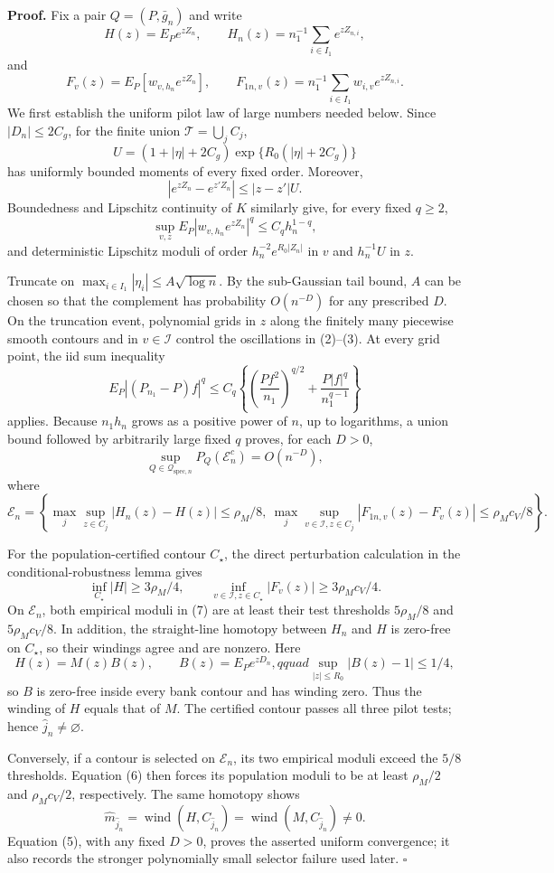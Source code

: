 \textbf{Proof.}
Fix a pair \(Q=(P,\bar g_n)\) and write
\[
 H(z)=E_Pe^{zZ_n},\qquad
 H_n(z)=n_1^{-1}\sum_{i\in I_1}e^{zZ_{n,i}},
\]
and
\[
 F_{v}(z)=E_P[w_{v,h_n}e^{zZ_n}],\qquad
 F_{1n,v}(z)=n_1^{-1}\sum_{i\in I_1}w_{i,v}e^{zZ_{n,i}}. \tag{1}
\]
We first establish the uniform pilot law of large numbers needed below.  Since \(|D_n|\le2C_g\), for the finite union \(\mathcal T=\bigcup_jC_j\),
\[
 U=(1+|\eta|+2C_g)\exp\{R_0(|\eta|+2C_g)\}
\]
has uniformly bounded moments of every fixed order.  Moreover,
\[
 |e^{zZ_n}-e^{z'Z_n}|\le |z-z'|U. \tag{2}
\]
Boundedness and Lipschitz continuity of \(K\) similarly give, for every fixed \(q\ge2\),
\[
 \sup_{v,z}E_P|w_{v,h_n}e^{zZ_n}|^q\le C_qh_n^{1-q}, \tag{3}
\]
and deterministic Lipschitz moduli of order \(h_n^{-2}e^{R_0|Z_n|}\) in \(v\) and \(h_n^{-1}U\) in \(z\).

Truncate on \(\max_{i\in I_1}|\eta_i|\le A\sqrt{\log n}\).  By the sub-Gaussian tail bound, \(A\) can be chosen so that the complement has probability \(O(n^{-D})\) for any prescribed \(D\).  On the truncation event, polynomial grids in \(z\) along the finitely many piecewise smooth contours and in \(v\in\mathcal I\) control the oscillations in (2)--(3).  At every grid point, the iid sum inequality
\[
 E_P|(P_{n_1}-P)f|^q
 \le C_q\left\{\left(\frac{Pf^2}{n_1}\right)^{q/2}
       +\frac{P|f|^q}{n_1^{q-1}}\right\} \tag{4}
\]
applies.  Because \(n_1h_n\) grows as a positive power of \(n\), up to logarithms, a union bound followed by arbitrarily large fixed \(q\) proves, for each \(D>0\),
\[
 \sup_{Q\in\mathcal Q_{\mathrm{spec},n}}P_Q(\mathcal E_n^c)=O(n^{-D}), \tag{5}
\]
where
\[
 \mathcal E_n=
 \left\{\max_j\sup_{z\in C_j}|H_n(z)-H(z)|\le\rho_M/8,\ 
 \max_j\sup_{v\in\mathcal I,z\in C_j}|F_{1n,v}(z)-F_v(z)|
 \le\rho_Mc_V/8\right\}. \tag{6}
\]

For the population-certified contour \(C_\star\), the direct perturbation calculation in the conditional-robustness lemma gives
\[
 \inf_{C_\star}|H|\ge3\rho_M/4,
 \qquad
 \inf_{v\in\mathcal I,z\in C_\star}|F_v(z)|\ge3\rho_Mc_V/4. \tag{7}
\]
On \(\mathcal E_n\), both empirical moduli in (7) are at least their test thresholds \(5\rho_M/8\) and \(5\rho_Mc_V/8\).  In addition, the straight-line homotopy between \(H_n\) and \(H\) is zero-free on \(C_\star\), so their windings agree and are nonzero.  Here
\[
 H(z)=M(z)B(z),\qquad B(z)=E_Pe^{zD_n},qquad
 \sup_{|z|\le R_0}|B(z)-1|\le1/4, \tag{8}
\]
so \(B\) is zero-free inside every bank contour and has winding zero.  Thus the winding of \(H\) equals that of \(M\).  The certified contour passes all three pilot tests; hence \(\widehat j_n\ne\varnothing\).

Conversely, if a contour is selected on \(\mathcal E_n\), its two empirical moduli exceed the \(5/8\) thresholds.  Equation (6) then forces its population moduli to be at least \(\rho_M/2\) and \(\rho_Mc_V/2\), respectively.  The same homotopy shows
\[
 \widehat m_{\widehat j_n}
 =\operatorname{wind}(H,C_{\widehat j_n})
 =\operatorname{wind}(M,C_{\widehat j_n})\ne0. \tag{9}
\]
Equation (5), with any fixed \(D>0\), proves the asserted uniform convergence; it also records the stronger polynomially small selector failure used later. \(\square\)
